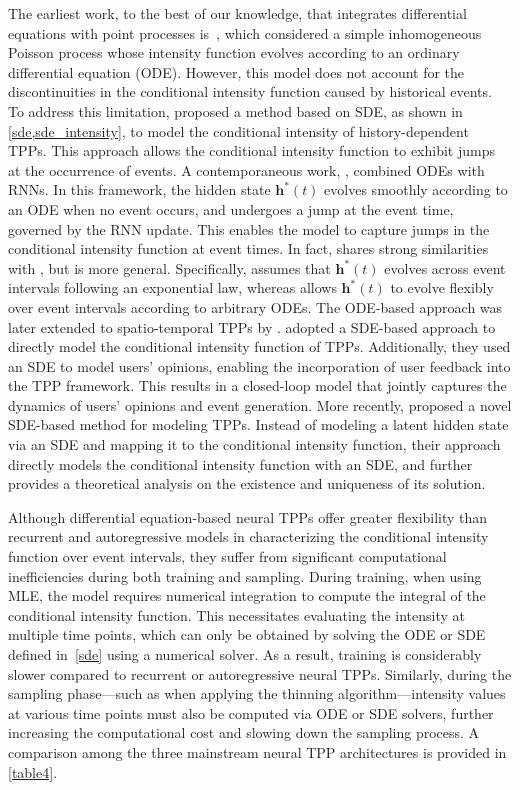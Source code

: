 \documentclass[10pt]{article} %
\begin{document}
The earliest work, to the best of our knowledge, that integrates differential equations with point processes is~\citet{chen2018neural}, which considered a simple inhomogeneous Poisson process whose intensity function evolves according to an ordinary differential equation (ODE). However, this model does not account for the discontinuities in the conditional intensity function caused by historical events. 
To address this limitation, \citet{jia2019neural} proposed a method based on SDE, as shown in \cref{sde,sde_intensity}, to model the conditional intensity of history-dependent TPPs. This approach allows the conditional intensity function to exhibit jumps at the occurrence of events. 
A contemporaneous work, \citet{rubanova2019latent}, combined ODEs with RNNs. In this framework, the hidden state $\mathbf{h}^*(t)$ evolves smoothly according to an ODE when no event occurs, and undergoes a jump at the event time, governed by the RNN update. This enables the model to capture jumps in the conditional intensity function at event times. 
In fact, \citet{rubanova2019latent} shares strong similarities with \citet{mei2017neural}, but is more general. Specifically, \citet{mei2017neural} assumes that $\mathbf{h}^*(t)$ evolves across event intervals following an exponential law, whereas \citet{rubanova2019latent} allows $\mathbf{h}^*(t)$ to evolve flexibly over event intervals according to arbitrary ODEs. 
The ODE-based approach was later extended to spatio-temporal TPPs by \citet{chenneural}. 
\citet{wang2018stochastic} adopted a SDE-based approach to directly model the conditional intensity function of TPPs. Additionally, they used an SDE to model users’ opinions, enabling the incorporation of user feedback into the TPP framework. This results in a closed-loop model that jointly captures the dynamics of users’ opinions and event generation. More recently, \citet{zhang2024neural} proposed a novel SDE-based method for modeling TPPs. Instead of modeling a latent hidden state via an SDE and mapping it to the conditional intensity function, their approach directly models the conditional intensity function with an SDE, and further provides a theoretical analysis on the existence and uniqueness of its solution.

Although differential equation-based neural TPPs offer greater flexibility than recurrent and autoregressive models in characterizing the conditional intensity function over event intervals, they suffer from significant computational inefficiencies during both training and sampling. During training, when using MLE, the model requires numerical integration to compute the integral of the conditional intensity function. This necessitates evaluating the intensity at multiple time points, which can only be obtained by solving the ODE or SDE defined in~\cref{sde} using a numerical solver. As a result, training is considerably slower compared to recurrent or autoregressive neural TPPs. Similarly, during the sampling phase—such as when applying the thinning algorithm—intensity values at various time points must also be computed via ODE or SDE solvers, further increasing the computational cost and slowing down the sampling process. 
A comparison among the three mainstream neural TPP architectures is provided in \cref{table4}. 
\end{document}
